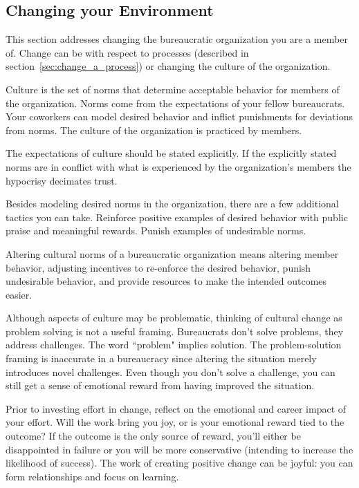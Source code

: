 \subsection*{Changing your Environment}


This section addresses changing the bureaucratic organization you are a member of. Change can be with respect to processes (described in section~\ref{sec:change_a_process}) or changing the \gls{culture} of the organization.

Culture is the set of norms that determine acceptable behavior for members of the organization. Norms come from the expectations of your fellow bureaucrats. Your coworkers can model desired behavior and inflict punishments for deviations from norms. The culture of the organization is practiced by members. 

The expectations of culture should be stated explicitly. If the explicitly stated norms are in conflict with what is experienced by the organization's members the hypocrisy decimates trust. 

Besides modeling desired norms in the organization, there are a few additional tactics you can take. 
Reinforce positive examples of desired behavior with public praise and meaningful rewards. Punish examples of undesirable norms. 

Altering cultural norms of a bureaucratic organization means altering member behavior, adjusting incentives to re-enforce the desired behavior, punish undesirable behavior, and provide resources to make the intended outcomes easier. 

Although aspects of culture may be problematic, thinking of cultural change as problem solving is not a useful framing. Bureaucrats don't solve problems, they address challenges. The word ``problem" implies solution. The problem-solution framing is inaccurate in a bureaucracy since altering the situation merely introduces novel challenges. 
Even though you don't solve a challenge, you can still get a sense of emotional reward from having improved the situation. 

Prior to investing effort in change, reflect on the emotional and career impact of your effort. Will the work bring you joy, or is your emotional reward tied to the outcome? If the outcome is the only source of reward, you'll either be disappointed in failure or you will be more conservative (intending to increase the likelihood of success). The work of creating positive change can be joyful: you can form relationships and focus on learning. 

